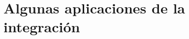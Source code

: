 \chapter{Algunas aplicaciones de la integración}

\begin{comment}

\setcounter{section}{1}
\section{El área de una región comprendida entre dos gráficas expresada como una integral}

\begin{teo} Supongamos que $f$ y $g$ son integrables y que satisfacen $f\leq q$ en $[a,b]$. La región $S$ entre sus gráficas es medible y su área $a(S)$ viene dada por la integral $$a(S) = \int_a^b [g(x)-f(x)] \; dx$$
    Demostración.- \; 
	Demostración.- \; Supongamos primero que $f$ y $g$ son no negativas,. Sean $F$ y $G$ los siguientes conjuntos:
	$$F = {(x,y)|a\leq x \leq b, 0\leq y \leq f(x)}, \quad G = {(x,y) | a\leq x \leq b, 0\leq y \leq g(x)}.$$
	Esto es, $G$ es el conjunto de ordenadas de $g$, y $F$ el de $f$, menos la gráfica de $f$. La región $S$ es la diferencia $G-F$. Según los teoremas 1.10 y 1.11, $F$ y $G$ son ambos medibles. Puesto que $F \subseteq G$ la diferencia $S = G-F$ es también medible, y se tiene 
	$$a(S) = a(G) - a(F) = \int_a^b g(x) \; dx = \int_a^b [g(x)-f(x)] \; dx$$
	Consideremos ahora el caso general cuando $f\leq q$ en $[a,b]$, pero no son necesariamente no negativas. Este caso lo podemos reducir al anterior trasladando la región hacia arriba hasta que quede situada encima del eje $x$. Esto es, elegimos un número positivo $c$ suficientemente grande que asegure que $0 \leq f(x) + c \leq g(x) + c$ para todo $x$ en $[a,b]$. Por lo ya demostrado la nueva región $T$ entre las gráficas de $f+c$ y $g+c$ es medible, y su parea viene dad por la integral
	$$a(T) = \int_a^b [(g(x)+c) - (f(x)+c)] = \int_[g(x)-f(x)] \; dx$$
	Pero siendo $T$ congruente a $S$, ésta es también medible y tenemos $$a(S) = a(T) = \int_a^b [g(x) - f(x)]\; dx$$
	Esto completa la demostración.\\\\
\end{teo}

\begin{tcolorbox}[colframe = white]
    \begin{nota} En los intervalos $[a,b]$ puede descomponerse en un número de subintervalos en cada uno de los cuales $f\leq g$ o $g\leq f$ la fórmula (2.1) del teorema 2.1 adopta la forma 
    $$a(S) = \int_a^b |g(x) -f(x)| \; dx$$
    \end{nota}
\end{tcolorbox}


\end{comment}
